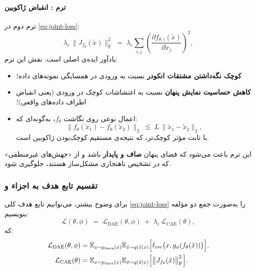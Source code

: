 \documentclass{article}
\begin{document}
\paragraph{ترم : انقباض ژاکوبین}
ترم دوم در \eqref{eq:joint-loss}:
\begin{equation}
\lambda_{\text{c}} \,
\bigl\lVert J_{f_\theta}(\tilde{x}) \bigr\rVert_{\text{F}}^{2}
\;=\;
\lambda_{\text{c}} \sum_{i,j}
\left(
\frac{\partial f_{\theta,i}(\tilde{x})}{\partial \tilde{x}_j}
\right)^2,
\end{equation}
یادآور ایده‌ی اصلی  است. نقش این ترم:

\begin{itemize}
	\item \textbf{کوچک نگه‌داشتن مشتقات انکودر} نسبت به ورودی در همسایگی نمونه‌های داده؛
	\item \textbf{کاهش حساسیت نمایش پنهان} نسبت به اغتشاشات کوچک در ورودی (یعنی انقباض اطراف داده‌های واقعی)؛
	\item اعمال نوعی  روی نگاشت \(f_\theta\)، به‌گونه‌ای که:
	\begin{equation}
	\bigl\lVert f_\theta(\tilde{x}_1) - f_\theta(\tilde{x}_2) \bigr\rVert_2
	\;\lesssim\;
	L \, \bigl\lVert \tilde{x}_1 - \tilde{x}_2 \bigr\rVert_2,
	\end{equation}
	با ثابت  مؤثر کوچک‌تر، که نتیجه‌ی مستقیم کوچک‌بودن ژاکوبین است.
\end{itemize}

این ترم باعث می‌شود که فضای پنهان \textbf{صاف و پایدار} باشد و از «جهش‌های غیرمنطقی» که در تشخیص ناهنجاری مشکل‌ساز هستند، جلوگیری شود.

\subsubsection{تقسیم تابع هدف به اجزاء  و }

برای وضوح بیشتر، می‌توانیم تابع هدف کلی \eqref{eq:joint-loss} را به‌صورت جمع دو مؤلفه بنویسیم:
\begin{equation}
	\mathcal{L}(\theta, \phi)
	\;=\;
	\mathcal{L}_{\text{DAE}}(\theta,\phi)
	\;+\;
	\lambda_{\text{c}} \, \mathcal{L}_{\text{CAE}}(\theta),
\end{equation}
که:
\begin{align}
	\mathcal{L}_{\text{DAE}}(\theta,\phi)
	&=
	\mathbb{E}_{x \sim p_{\text{data}}(x)}
	\mathbb{E}_{\tilde{x} \sim q(\tilde{x}\mid x)}
	\Bigl[
	\ell_{\text{rec}}\bigl(x, g_\phi(f_\theta(\tilde{x}))\bigr)
	\Bigr],
	\\
	\mathcal{L}_{\text{CAE}}(\theta)
	&=
	\mathbb{E}_{x \sim p_{\text{data}}(x)}
	\mathbb{E}_{\tilde{x} \sim q(\tilde{x}\mid x)}
	\Bigl[
	\bigl\lVert J_{f_\theta}(\tilde{x}) \bigr\rVert_{\text{F}}^{2}
	\Bigr].
\end{align}
\end{document}
